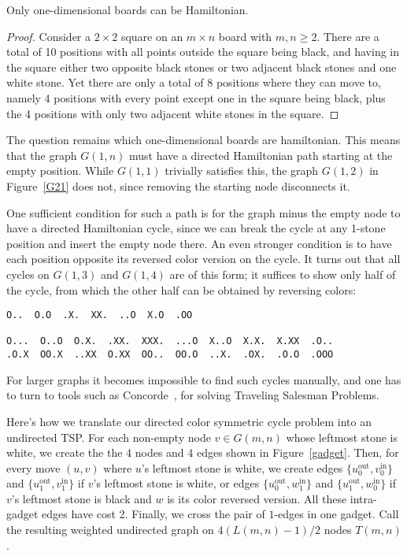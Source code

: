 \documentclass{article}
\begin{document}
\begin{theorem}
Only one-dimensional boards can be Hamiltonian.
\end{theorem}

\begin{proof}
Consider a $2 \times 2$ square on an $m \times n$ board with $m,n \geq 2$.
There are a total of 10 positions with all points
outside the square being black, and having in the square
either two opposite black stones
or two adjacent black stones and one white stone.
Yet there are only a total of 8 positions where they can move to, namely
4 positions with every point except one in the square being black,
plus the 4 positions with only two adjacent white stones in the square.
\end{proof}

The question remains which one-dimensional boards are hamiltonian.
This means that the graph $G(1,n)$ must have a directed
Hamiltonian path starting at the empty position. While
$G(1,1)$ trivially satisfies this, the graph $G(1,2)$
in Figure~\ref{G21} does not, since removing the starting node
disconnects it.

One sufficient condition for such a path is
for the graph minus the empty node to have a directed Hamiltonian
cycle, since we can break the cycle at any 1-stone position and insert
the empty node there. An even stronger condition is to have each
position opposite its reversed color version on the cycle. It turns
out that all cycles on $G(1,3)$ and $G(1,4)$ are of this form;
it suffices to show only half of the cycle, from which the other half
can be obtained by reversing colors:
\begin{verbatim} 
O..  O.O  .X.  XX.  ..O  X.O  .OO

O...  O..O  O.X.  .XX.  XXX.  ...O  X..O  X.X.  X.XX  .O..
.O.X  OO.X  ..XX  O.XX  OO..  OO.O  ..X.  .OX.  .O.O  .OOO
\end{verbatim} 

For larger graphs it becomes impossible to find such cycles manually,
and one has to turn to tools such as Concorde~\cite{concorde},
for solving Traveling Salesman Problems.

Here's how we translate our directed color symmetric cycle problem into
an undirected TSP. For each non-empty node $v \in G(m,n)$ whose
leftmost stone is white, we create the the 4 nodes and 4 edges shown in
Figure~\ref{gadget}. Then, for every move $(u,v)$ where $u$'s leftmost
stone is white, we create edges $\{u_{0}^{\mbox{out}},v_{0}^{\mbox{in}}\}$
and $\{u_{1}^{\mbox{out}},v_{1}^{\mbox{in}}\}$ if $v$'s leftmost
stone is white, or edges $\{u_{0}^{\mbox{out}},w_{1}^{\mbox{in}}\}$
and $\{u_{1}^{\mbox{out}},w_{0}^{\mbox{in}}\}$ if $v$'s leftmost
stone is black and $w$ is its color reversed version.
All these intra-gadget edges have cost 2.
Finally, we cross the pair of $1$-edges in one gadget. Call the resulting
weighted undirected graph on $4(L(m,n)-1)/2$ nodes $T(m,n)$.
\end{document}
